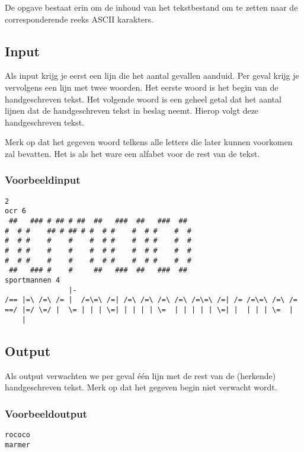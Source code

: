 De opgave bestaat erin om de inhoud van het tekstbestand om te zetten naar de
corresponderende reeks ASCII karakters.

\subsection*{Input}

Als input krijg je eerst een lijn die het aantal gevallen aanduid. Per geval
krijg je vervolgens een lijn met twee woorden. Het eerste woord is het begin van
de handgeschreven tekst. Het volgende woord is een geheel getal dat het aantal
lijnen dat de handgeschreven tekst in beslag neemt. Hierop volgt deze
handgeschreven tekst.

Merk op dat het gegeven woord telkens alle letters die later kunnen voorkomen
zal bevatten. Het is als het ware een alfabet voor de rest van de tekst.

\subsubsection*{Voorbeeldinput}

\begin{verbatim}
2
ocr 6
 ##   ### # ## # ##  ##   ###  ##   ###  ##
#  # #    ## # ## # #  # #    #  # #    #  #
#  # #    #    #    #  # #    #  # #    #  #
#  # #    #    #    #  # #    #  # #    #  #
#  # #    #    #    #  # #    #  # #    #  #
 ##   ### #    #     ##   ###  ##   ###  ##
sportmannen 4
               |-
/== |=\ /=\ /= |  /=\=\ /=| /=\ /=\ /=\ /=\ /=\=\ /=| /= /=\=\ /=\ /=
==/ |=/ \=/ |  \= | | | \=| | | | | \=  | | | | | \=| |  | | | \=  |
    |
\end{verbatim}

\subsection*{Output}

Als output verwachten we per geval \'e\'en lijn met de rest van de (herkende)
handgeschreven tekst. Merk op dat het gegeven begin niet verwacht wordt.

\subsubsection*{Voorbeeldoutput}

\begin{verbatim}
rococo
marmer
\end{verbatim}

